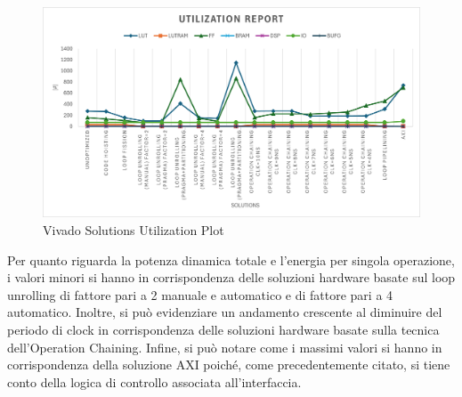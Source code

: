 \begin{figure}[H]
	\centering
	\includegraphics[width=0.6\textheight]{conclusions/utilization.png}
	\caption{Vivado Solutions Utilization Plot}
	\label{fig:vivado-solutions-utilization-plot}
\end{figure}


Per quanto riguarda la potenza dinamica totale e l'energia per singola operazione, i valori minori si hanno in corrispondenza delle soluzioni hardware basate sul loop unrolling di fattore pari a 2 manuale e automatico e di fattore pari a 4 automatico. Inoltre, si può evidenziare un andamento crescente al diminuire del periodo di clock in corrispondenza delle soluzioni hardware basate sulla tecnica dell'Operation Chaining. Infine, si può notare come i massimi valori si hanno in corrispondenza della soluzione AXI poiché, come precedentemente citato, si tiene conto della logica di controllo associata all'interfaccia.

